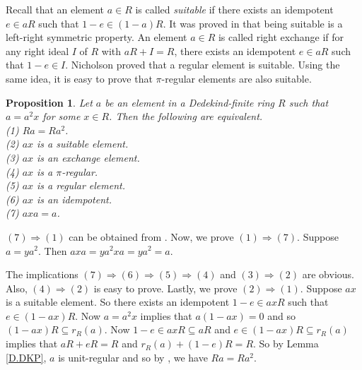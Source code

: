 \documentclass[12pt]{article}
\makeatletter
\theoremstyle{plain}
\newtheorem{prop}[thm]{Proposition}
\theoremstyle{definition}
\renewenvironment{proof}[1][\proofname]{%
	\par\pushQED{\qed}%
	\normalfont %
	\topsep6\p@\@plus6\p@\relax
	\trivlist
	\item[\hskip\labelsep\bfseries #1\@addpunct{.}]%
}{%
	\popQED\endtrivlist\@endpefalse
}
\renewcommand{\proofname}{Proof}
\makeatother
\begin{document}
	Recall that an element $a\in R$ is called {\em suitable} if there exists an idempotent $e \in aR$ such that $1-e \in (1-a)R$. It was proved in \cite{TAMS} that being suitable is a left-right symmetric property. An element $a\in R$ is called right exchange if for any right ideal $I$ of $R$  with $aR + I = R$, there exists an idempotent $e \in aR$ such that $1-e \in I$. Nicholson \cite[Proposition 1.6]{Nic77} proved that a regular element is suitable. Using the same idea, it is easy to prove that $\pi$-regular elements are also suitable.
	\begin{prop}\label{D.NaSc}
		Let $a$ be an element in a Dedekind-finite ring $R$ such that $a = a^2x$ for some $x \in R$. Then the following are equivalent.\\[2mm]
		\textup{(1)} $Ra=Ra^2$.\\[2mm]
		\textup{(2)} $ax$ is a suitable element. \\[2mm]
		\textup{(3)} $ax$ is an exchange element.\\[2mm]
		\textup{(4)} $ax$ is a $\pi$-regular.\\[2mm]
		\textup{(5)} $ax$ is a regular element. \\[2mm]
		\textup{(6)} $ax$ is an idempotent.\\[2mm]
		\textup{(7)} $axa = a$. 
	\end{prop}
	\begin{proof}
		$(7) \Rightarrow (1)$ can be obtained from \cite[Lemma 3.3]{Dit}. Now, we prove $(1) \Rightarrow (7)$. Suppose $a = ya^2$. Then $axa = ya^2xa = ya^2 = a$. 
		
		The implications $(7) \Rightarrow (6) \Rightarrow (5) \Rightarrow (4)$ and $ (3) \Rightarrow (2)$ are obvious.  Also, $(4) \Rightarrow (2)$ is easy to prove. Lastly, we prove $(2) \Rightarrow (1)$. Suppose $ax$ is a suitable element. So there exists an idempotent $1-e \in axR$ such that $e \in (1-ax)R$. Now $a = a^2x$ implies that $a(1-ax) = 0$ and so $(1-ax)R \subseteq r_R(a)$. Now $1-e \in axR \subseteq aR$ and $e \in (1-ax)R \subseteq r_R(a)$ implies that $aR + eR = R$ and $r_R(a) + (1-e)R = R$. So by Lemma \ref{D.DKP}, $a$ is unit-regular and so by \cite[Lemma 3.3]{Dit}, we have $Ra = Ra^2$. 
	\end{proof}
	
\end{document}
